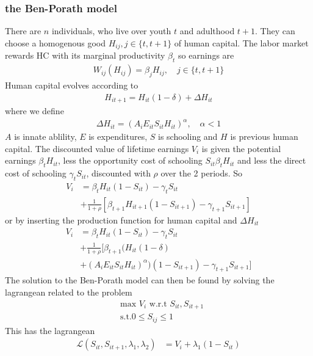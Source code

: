\documentclass[12pt, a4paper]{article}
\begin{document}
\begin{multicols}{2}
\subsubsection{the Ben-Porath model}
There are $n$ individuals, who live over youth $t$ and adulthood $t+1$. They can choose a homogenous good $H_{ij}, j \in \{t,t+1\}$ of human capital. The labor market rewards HC with its marginal productivity $\beta_{t}$ so earnings are 
\begin{align*}
W_{ij}(H_{ij}) = \beta_j H_{ij}, \quad j\in \{t,t+1\}
\end{align*}
Human capital evolves according to
\begin{align*}
H_{it+1} = H_{it}(1-\delta) + \Delta H_{it}
\end{align*}
where we define 
\begin{align*}
\Delta H_{it} = (A_i E_{it} S_{it} H_{it})^{\alpha}, \quad \alpha<1
\end{align*}
$A$ is innate ablility, $E$ is expenditures, $S$ is schooling and $H$ is previous human capital. The discounted value of lifetime earnings $V_i$ is given the potential earnings $\beta_tH_{it}$, less the opportunity cost of schooling $S_{it}\beta_tH_{it}$ and less the direct cost of schooling $\gamma_t S_{it}$, discounted with $\rho$ over the 2 periods. So 
\begin{align*}
V_i &= \beta_tH_{it}(1-S_{it}) - \gamma_t S_{it}  \\
&+ \frac{1}{1+\rho}[\beta_{t+1}H_{it+1}(1-S_{it+1}) - \gamma_{t+1} S_{it+1}]
\end{align*}
or by inserting the production function for human capital and $\Delta H_{it}$
\begin{align*}
V_i &= \beta_tH_{it}(1-S_{it}) - \gamma_t S_{it}  \\
&+ \frac{1}{1+\rho}[\beta_{t+1}(H_{it}(1-\delta)  \\
&+ (A_i E_{it} S_{it} H_{it})^{\alpha})(1-S_{it+1}) - \gamma_{t+1} S_{it+1}]
\end{align*}
The solution to the Ben-Porath model can then be found by solving the lagrangean related to the problem
\begin{align*}
&\text{max } V_i \text{ w.r.t } S_{it}, S_{it+1} \\
& \text{s.t.} 0\leq S_{ij} \leq 1
\end{align*}
This has the lagrangean 
\begin{align*}
\mathcal{L}(S_{it}, S_{it+1}, \lambda_1, \lambda_2) &= V_i + \lambda_1(1- S_{it}) \\

\end{align*}
\end{multicols}
\end{document}

